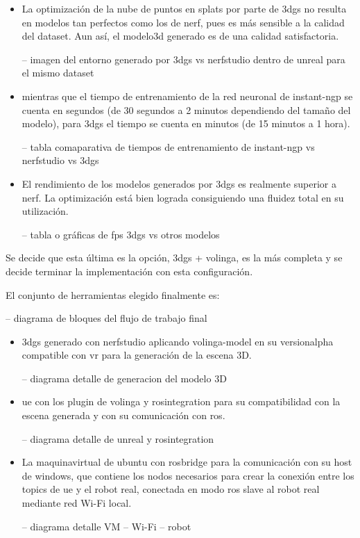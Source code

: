 \documentclass[a4paper, 12pt, spanish, twoside]{article}
\begin{document}
\begin{itemize} 

\item La optimización de la nube de puntos en \glspl{splat} por parte de \acrshort{3dgs} no resulta en modelos tan perfectos como los de \acrshort{nerf}, pues es más sensible a la calidad del \gls{dataset}. Aun así, el \gls{modelo3d} generado es de una calidad satisfactoria. 

-- imagen del entorno generado por 3dgs vs nerfstudio dentro de unreal para el mismo dataset 

\item mientras que el tiempo de entrenamiento de la red neuronal de \gls{instant-ngp} se cuenta en segundos (de 30 segundos a 2 minutos dependiendo del tamaño del modelo), para \acrshort{3dgs} el tiempo se cuenta en minutos (de 15 minutos a 1 hora). 

-- tabla comaparativa de tiempos de entrenamiento de instant-ngp vs nerfstudio vs 3dgs 

\item El rendimiento de los modelos generados por \acrshort{3dgs} es realmente superior a \gls{nerf}. La optimización está bien lograda consiguiendo una fluidez total en su utilización. 

-- tabla o gráficas de fps 3dgs vs otros modelos 

\end{itemize} 

Se decide que esta última es la opción, \acrshort{3dgs} + \gls{volinga}, es la más completa y se decide terminar la implementación con esta configuración. 

 

El conjunto de herramientas elegido finalmente es: 

-- diagrama de bloques del flujo de trabajo final 

\begin{itemize} 

\item \acrshort{3dgs} generado con \gls{nerfstudio} aplicando \gls{volinga-model} en su \gls{versionalpha} compatible con \acrshort{vr} para la generación de la escena 3D. 

-- diagrama detalle de generacion del modelo 3D 

\item \acrlong{ue} con los \gls{plugin} de \gls{volinga} y \gls{rosintegration} para su compatibilidad con la escena generada y con su comunicación con \acrshort{ros}. 

-- diagrama detalle de unreal y rosintegration 

\item La \gls{maquinavirtual} de \gls{ubuntu} con \gls{rosbridge} para la comunicación con su \gls{host} de \gls{windows}, que contiene los nodos necesarios para crear la conexión entre los \glspl{topic} de \acrshort{ue} y el robot real, conectada en modo \acrshort{ros} slave al robot real mediante red Wi-Fi local. 

-- diagrama detalle VM – Wi-Fi – robot  

\end{itemize} 
\end{document}
